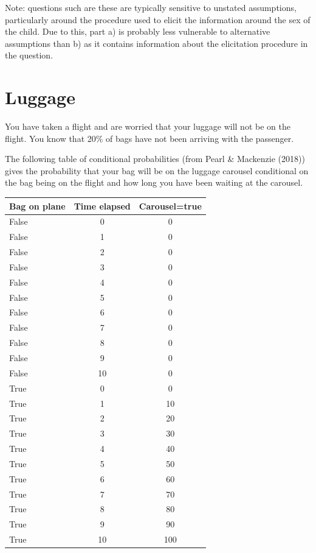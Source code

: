 \documentclass[
  letterpaper,
  DIV=11,
  numbers=noendperiod]{scrreprt}
\begin{document}
\begin{tcolorbox}
Note: questions such are these are typically sensitive to unstated
assumptions, particularly around the procedure used to elicit the
information around the sex of the child. Due to this, part a) is
probably less vulnerable to alternative assumptions than b) as it
contains information about the elicitation procedure in the question.

\end{tcolorbox}

\hypertarget{luggage}{%
\section{Luggage}\label{luggage}}

You have taken a flight and are worried that your luggage will not be on
the flight. You know that 20\% of bags have not been arriving with the
passenger.

The following table of conditional probabilities (from Pearl \&
Mackenzie (2018)) gives the probability that your bag will be on the
luggage carousel conditional on the bag being on the flight and how long
you have been waiting at the carousel.

\begin{longtable}[]{@{}lcc@{}}
\toprule()
Bag on plane & Time elapsed & Carousel=true \\
\midrule()
\endhead
False & 0 & 0 \\
False & 1 & 0 \\
False & 2 & 0 \\
False & 3 & 0 \\
False & 4 & 0 \\
False & 5 & 0 \\
False & 6 & 0 \\
False & 7 & 0 \\
False & 8 & 0 \\
False & 9 & 0 \\
False & 10 & 0 \\
True & 0 & 0 \\
True & 1 & 10 \\
True & 2 & 20 \\
True & 3 & 30 \\
True & 4 & 40 \\
True & 5 & 50 \\
True & 6 & 60 \\
True & 7 & 70 \\
True & 8 & 80 \\
True & 9 & 90 \\
True & 10 & 100 \\
\bottomrule()
\end{longtable}
\end{document}
